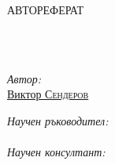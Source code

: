 \frontmatter %

\pagestyle{plain} %


\begin{titlepage}
\begin{center}
\vspace*{.06\textheight}
{\scshape\LARGE \univname\par}\vspace{1.5cm} %
{\scshape\LARGE \compname\par}\vspace{1.5cm} %
\textsc{\Large АВТОРЕФЕРАТ}\\[0.5cm] %

\HRule \\[0.4cm] %
{\huge \bfseries \ttitle\par}\vspace{0.4cm} %
\HRule \\[1.5cm] %
 
\begin{minipage}[t]{0.4\textwidth}
\begin{flushleft} \large
\emph{Автор:}\\
\href{http://senderov.net}{Виктор \textsc{Сендеров}} %
\end{flushleft}
\end{minipage}
\begin{minipage}[t]{0.4\textwidth}
\begin{flushright} \large
\emph{Научен ръководител:} \\
\href{http://pensoft.net}{\supname} \\ %
\emph{Научен консултант:} \\
\href{http://bultreebank.org/en/our-team/kiril-simov/}{\consname} %

\end{flushright}
\end{minipage}\\[3cm]


\end{center}
\end{titlepage}
